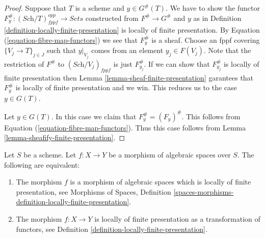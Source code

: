 \begin{proof}
Suppose that $T$ is a scheme and $y \in G^\#(T)$.
We have to show the functor
$F^\#_y : (\textit{Sch}/T)_{fppf}^{opp} \to \textit{Sets}$
constructed from $F^\# \to G^\#$ and $y$ as in
Definition \ref{definition-locally-finite-presentation}
is locally of finite presentation.
By Equation (\ref{equation-fibre-map-functors})
we see that $F^\#_y$ is a sheaf. Choose an fppf covering
$\{V_j \to T\}_{j \in J}$ such that $y|_{V_j}$ comes from
an element $y_j \in F(V_j)$.
Note that the restriction of $F^\#$ to $(\textit{Sch}/V_j)_{fppf}$
is just $F^\#_{y_j}$. If we can show that $F^\#_{y_j}$ is
locally of finite presentation then
Lemma \ref{lemma-sheaf-finite-presentation}
garantees that $F^\#_y$ is locally of finite presentation and
we win. This reduces us to the case $y \in G(T)$.

\medskip\noindent
Let $y \in G(T)$. In this case we claim that $F^\#_y = (F_y)^\#$.
This follows from 
Equation (\ref{equation-fibre-map-functors}).
Thus this case follows from
Lemma \ref{lemma-sheafify-finite-presentation}.
\end{proof}

\begin{proposition}
\label{proposition-characterize-locally-finite-presentation}
Let $S$ be a scheme. Let $f : X \to Y$ be a morphism of algebraic
spaces over $S$. The following are equivalent:
\begin{enumerate}
\item The morphism $f$ is a morphism of algebraic spaces which is
locally of finite presentation, see
Morphisms of Spaces,
Definition \ref{spaces-morphisms-definition-locally-finite-presentation}.
\item The morphism $f : X \to Y$ is locally of finite presentation as
a transformation of functors, see
Definition \ref{definition-locally-finite-presentation}.
\end{enumerate}
\end{proposition}

